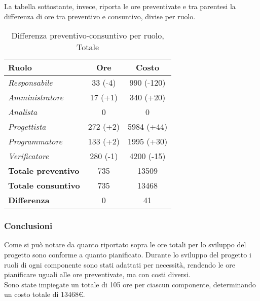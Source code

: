 La tabella sottostante, invece, riporta le ore preventivate e  tra parentesi la differenza di ore tra preventivo e consuntivo, divise per ruolo.

\begin{table}[H]
	\begin{center}
		\begin{tabular}{|l|c|c|}
			\hline
			\textbf{Ruolo}	& \textbf{Ore} & \textbf{Costo} 					\\
			\hline
			\textit{Responsabile}		&	33 (-4)			&	990	(-120)		\\
			\hline
			\textit{Amministratore}		&	17	(+1)		&	340	(+20)		\\
			\hline
			\textit{Analista}			&	0				&	0				\\
			\hline
			\textit{Progettista}		&	272	(+2)		&	5984 (+44)		\\
			\hline
			\textit{Programmatore}		&	133	(+2)		&	1995 (+30)		\\
			\hline
			\textit{Verificatore}		&	280	(-1)		&	4200 (-15)		\\
			\hline	
			\textbf{Totale preventivo}	&	735				& 	13509			\\
			\hline
			\textbf{Totale consuntivo}	&	735				&  	13468			\\
			\hline
			\textbf{Differenza} 		&	0				&	41				\\
			\hline
		\end{tabular}
	\end{center}
	\caption{Differenza preventivo-consuntivo per ruolo, Totale}
\end{table}

\subsubsection{Conclusioni}
Come si può notare da quanto riportato sopra le ore totali per lo sviluppo del progetto sono conforme a quanto pianificato. Durante lo sviluppo del progetto i ruoli di ogni componente sono stati adattati per necessità, rendendo le ore pianificare uguali alle ore preventivate, ma con costi diversi. \\
Sono state impiegate un totale di 105 ore per ciascun componente, determinando un costo totale di 13468€.